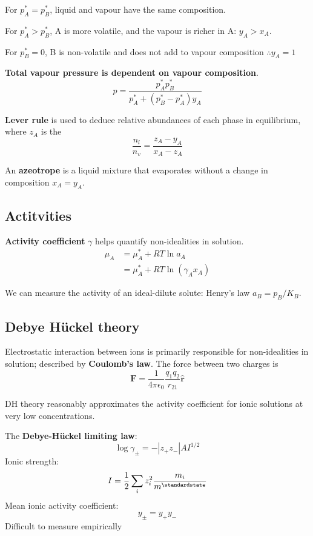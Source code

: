 For $p_A^* = p_B^*$, liquid and vapour have the same composition.

For $p_A^* > p_B^*$, A is more volatile, and the vapour is richer in A: $y_A > x_A$.

For $p_B^* = 0$, B is non-volatile and does not add to vapour composition $\therefore y_A = 1$

\textbf{Total vapour pressure is dependent on vapour composition}.
\begin{equation*}
    p = \frac{p_A^* p_B^*}{p^*_A + (p_B^* - p_A^*)y_A}
\end{equation*}

\textbf{Lever rule} is used to deduce relative abundances
 of each phase in equilibrium, where $z_A$ is the
 \begin{equation*}
    \frac{n_l}{n_v} = \frac{z_A - y_A}{x_A - z_A}
 \end{equation*}

 An \textbf{azeotrope} is a liquid mixture that evaporates without a change in composition $x_A = y_A$.
\subsection*{Actitvities}
\textbf{Activity coefficient} $\gamma$ helps quantify non-idealities in solution.
\begin{equation*}
    \begin{aligned}
        \mu_A &= \mu_A^* + RT \ln a_A \\
        &= \mu_A^* + RT \ln (\gamma_A x_A)
    \end{aligned}
\end{equation*}

We can measure the activity of an ideal-dilute solute: Henry's law $a_B = p_B / K_B$.
\subsection*{Debye H\"uckel theory}
Electrostatic interaction between ions is primarily responsible for non-idealities
in solution; described by \textbf{Coulomb's law}.
The force between two charges is
\begin{equation*}
  \mathbf{F} = \frac{1}{4\pi\epsilon_0}\frac{q_1q_2}{r_{21}}\hat{\mathbf{r}}
\end{equation*}

DH theory reasonably approximates the activity coefficient for ionic solutions at very low 
concentrations. 


The \textbf{Debye-H\"uckel limiting law}:
\begin{equation*}
    \log \gamma_\pm = - |z_+ z_-| AI^{1/2}
\end{equation*}
Ionic strength:
\begin{equation*}
    I = \frac{1}{2}\sum_i z_i^2 \frac{m_i}{m^\standardstate}
\end{equation*}
Mean ionic activity coefficient:
\begin{equation*}
    y_\pm = y_+ y_-
\end{equation*}
Difficult to measure empirically

 